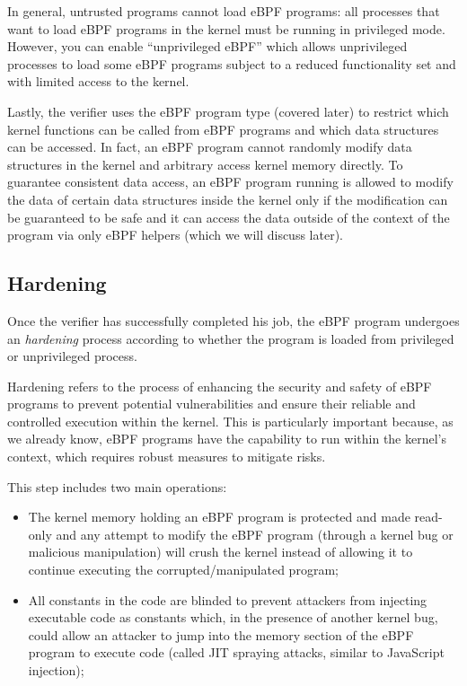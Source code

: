 In general, untrusted programs cannot load eBPF programs: all processes that want to load eBPF programs in the kernel must be running in privileged mode.
However, you can enable ``unprivileged eBPF'' which allows unprivileged processes to load some eBPF programs subject to a reduced functionality set and with limited access to the kernel.

Lastly, the verifier uses the eBPF program type (covered later) to restrict which kernel functions can be called from eBPF programs and which data structures can be accessed. 
In fact, an eBPF program cannot randomly modify data structures in the kernel and arbitrary access kernel memory directly.
To guarantee consistent data access, an eBPF program running is allowed to modify the data of certain data structures inside the kernel only if the modification can be guaranteed to be safe and it can access the data outside of the context of the program via only eBPF helpers (which we will discuss later).

\subsection{Hardening}

Once the verifier has successfully completed his job, the eBPF program undergoes an \textit{hardening} process according to whether the program is loaded from privileged or unprivileged process.

Hardening refers to the process of enhancing the security and safety of eBPF programs to prevent potential vulnerabilities and ensure their reliable and controlled execution within the kernel. 
This is particularly important because, as we already know, eBPF programs have the capability to run within the kernel's context, which requires robust measures to mitigate risks.

This step includes two main operations:

\begin{itemize}
	\item 
		The kernel memory holding an eBPF program is protected and made read-only and any attempt to modify the eBPF program (through a kernel bug or malicious manipulation) will crush the kernel instead of allowing it to continue executing the corrupted/manipulated program;
	\item 
		All constants in the code are blinded to prevent attackers from injecting executable code as constants which, in the presence of another kernel bug, could allow an attacker to jump into the memory section of the eBPF program to execute code (called JIT spraying attacks, similar to JavaScript injection);
\end{itemize}

